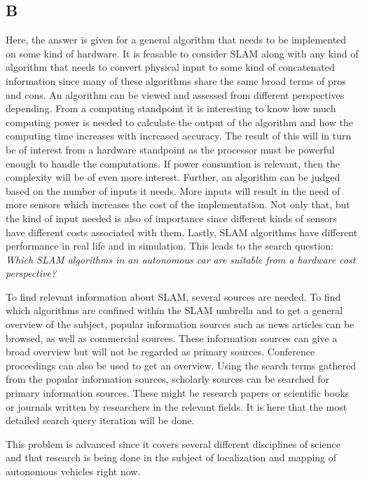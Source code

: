 \documentclass[a4paper, 12pt]{article}
\begin{document}
\subsection*{B}
Here, the answer is given for a general algorithm that needs to be implemented on some
kind of hardware. It is feasable to consider SLAM along with any kind of algorithm that
needs to convert physical input to some kind of concatenated information since 
many of these algorithms share the same broad terms of pros and cons. 
An algorithm can be viewed and assessed from different perspectives depending. 
From a computing standpoint it is interesting to know how much computing power is 
needed to calculate the output of the algorithm and how the computing time increases
with increased accuracy. The result of this will in turn be of interest from a
hardware standpoint as the processor must be powerful enough to handle the computations.
If power consumtion is relevant, then the complexity will be of even more interest.
Further, an algorithm can be judged based on the number of inputs it needs. More
inputs will result in the need of more sensors which increases the cost of the 
implementation. Not only that, but the kind of input needed is also of importance 
since different kinds of sensors have different costs associated with them.
Lastly, SLAM algorithms have different performance in real life and in simulation.
This leads to the search question: {\it Which SLAM algorithms in an autonomous car are 
suitable from a hardware cost perspective?}

To find relevant information about SLAM, several sources are needed. To find 
which algorithms are confined within the SLAM umbrella and to get a general
overview of the subject, popular information sources such as news articles can 
be browsed, as well as commercial sources. These information sources can 
give a broad overview but will not be regarded as primary sources. Conference 
proceedings can also be used to get an overview. Using the search
terms gathered from the popular information sources, scholarly sources can be 
searched for primary information sources. These might be research papers or 
scientific books or journals written by researchers in the relevant fields. It 
is here that the most detailed search query iteration will be done. 

This problem is advanced since it covers several different disciplines of science
and that research is being done in the subject of localization and mapping of
autonomous vehicles right now. 
\end{document}
